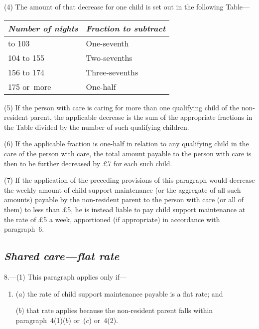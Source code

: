 \documentclass[12pt,a4paper]{article}
\begin{document}
(4) The amount of that decrease for one child is set out in the following Table—

\medskip

{\footnotesize\noindent
\begin{longtable}{ll}
\hline
\itshape Number of nights	& \itshape Fraction to subtract\\
\hline
\endhead
\hline
\endlastfoot
52 to 103	&One-seventh\\
104 to 155	&Two-sevenths\\
156 to 174	&Three-sevenths\\
175 or~more	&One-half\\
\end{longtable}

}

\medskip

(5) If the person with care is caring for more than one qualifying child of the non-resident parent, the applicable decrease is the sum of the appropriate fractions in the Table divided by the number of such qualifying children.

(6) If the applicable fraction is one-half in relation to any qualifying child in the care of the person with care, the total amount payable to the person with care is then to be further decreased by £7 for each such child.

(7) If the application of the preceding provisions of this paragraph would decrease the weekly amount of child support maintenance (or the aggregate of all such amounts) payable by the non-resident parent to the person with care (or all of them) to less than £5, he is instead liable to pay child support maintenance at the rate of £5 a week, apportioned (if appropriate) in accordance with paragraph~6. 

\subsection*{\itshape Shared care—flat rate}

8.---(1) This paragraph applies only if—
\begin{enumerate}\item[]
($a$) the rate of child support maintenance payable is a flat rate; and

($b$) that rate applies because the non-resident parent falls within paragraph~4(1)($b$)  or~($c$)  or~4(2).
\end{enumerate}
\end{document}
